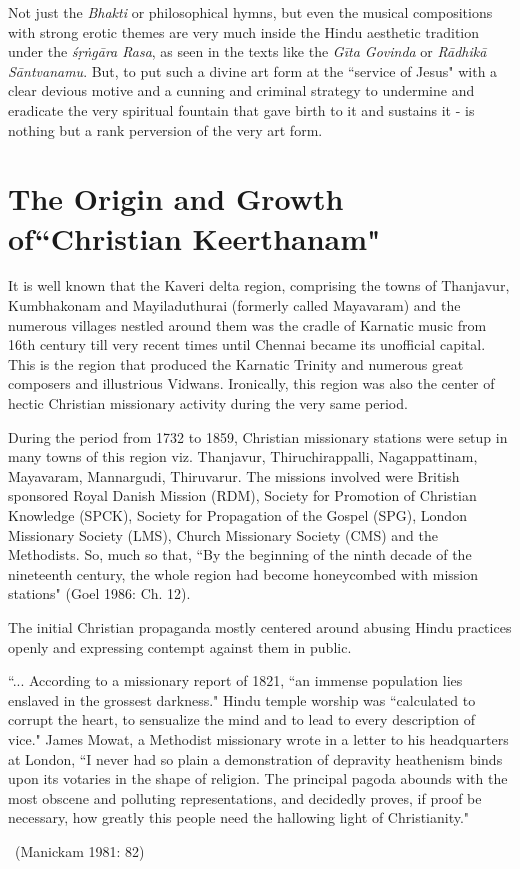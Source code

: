 Not just the \textit{Bhakti} or philosophical hymns, but even the musical compositions with strong erotic themes are very much inside the Hindu aesthetic tradition under the \textit{śṛṅgāra Rasa}, as seen in the texts like the \textit{Gīta Govinda} or \textit{Rādhikā Sāntvanamu}. But, to put such a divine art form at the ``service of Jesus" with a clear devious motive and a cunning and criminal strategy to undermine and eradicate the very spiritual fountain that gave birth to it and sustains it - is nothing but a rank perversion of the very art form.

\vspace{-.3cm}

\section*{The Origin and Growth of\hfill \break ``Christian Keerthanam"}

It is well known that the Kaveri delta region, comprising the towns of Thanjavur, Kumbhakonam and Mayiladuthurai (formerly called Mayavaram) and the numerous villages nestled around them was the cradle of Karnatic music from 16th century till very recent times until Chennai became its unofficial capital. This is the region that produced the Karnatic Trinity and numerous great composers and illustrious Vidwans. Ironically, this region was also the center of hectic Christian missionary activity during the very same period.

During the period from 1732 to 1859, Christian missionary stations were setup in many towns of this region viz. Thanjavur, Thiruchirappalli, Nagappattinam, Mayavaram, Mannargudi, Thiruvarur. The missions involved were British sponsored Royal Danish Mission (RDM), Society for Promotion of Christian Knowledge (SPCK), Society for Propagation of the Gospel (SPG), London Missionary Society (LMS), Church Missionary Society (CMS) and the Methodists. So, much so that, ``By the beginning of the ninth decade of the nineteenth century, the whole region had become honeycombed with mission stations" (Goel 1986: Ch. 12).

The initial Christian propaganda mostly centered around abusing Hindu practices openly and expressing contempt against them in public.

\begin{myquote}
``... According to a missionary report of 1821, ``an immense population lies enslaved in the grossest darkness." Hindu temple worship was ``calculated to corrupt the heart, to sensualize the mind and to lead to every description of vice." James Mowat, a Methodist missionary wrote in a letter to his headquarters at London, ``I never had so plain a demonstration of depravity heathenism binds upon its votaries in the shape of religion. The principal pagoda abounds with the most obscene and polluting representations, and decidedly proves, if proof be necessary, how greatly this people need the hallowing light of Christianity." 

~\hfill (Manickam 1981: 82)
\end{myquote}

